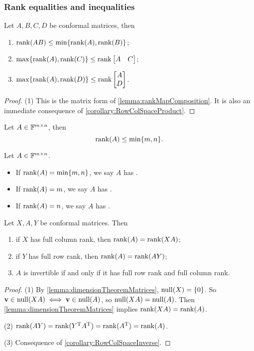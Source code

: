 \subsubsection{Rank equalities and inequalities}
\begin{proposition} \label{prop:rankMultiplication}
Let $A,B,C,D$ be conformal matrices, then
\begin{enumerate}
\item $\operatorname{rank}(AB) \leq \min\{\operatorname{rank}(A),\operatorname{rank}(B)\}$;
\item $\max\{\operatorname{rank}(A),\operatorname{rank}(C)\} \leq \operatorname{rank} \begin{bmatrix}
A & C
\end{bmatrix}$;
\item $\max\{\operatorname{rank}(A),\operatorname{rank}(D)\} \leq \operatorname{rank} \begin{bmatrix}
A \\ D
\end{bmatrix}$.
\end{enumerate}
\end{proposition}
\begin{proof}
(1) This is the matrix form of \ref{lemma:rankMapComposition}. It is also an immediate consequence of \ref{corollary:RowColSpaceProduct}.
\end{proof}

\begin{lemma}
Let $A\in\mathbb{F}^{m\times n}$, then
\[ \operatorname{rank}(A) \leq \min\{m,n\}. \]
\end{lemma}
\begin{definition}
Let $A\in\mathbb{F}^{m\times n}$.
\begin{itemize}
\item If $\operatorname{rank}(A) = \min\{m,n\}$, we say $A$ has .
\item If $\operatorname{rank}(A) = m$, we say $A$ has .
\item If $\operatorname{rank}(A) = n$, we say $A$ has .
\end{itemize}
\end{definition}

\begin{lemma}
Let $X,A,Y$ be conformal matrices. Then
\begin{enumerate}
\item if $X$ has full column rank, then $\operatorname{rank}(A) = \operatorname{rank}(XA)$;
\item if $Y$ has full row rank, then $\operatorname{rank}(A) = \operatorname{rank}(AY)$;
\item $A$ is invertible \textup{if and only if} it has full row rank and full column rank.
\end{enumerate}
\end{lemma}
\begin{proof}
(1) By \ref{lemma:dimensionTheoremMatrices}, $\operatorname{null}(X) = \{0\}$. So $\bm{\mathrm{v}}\in\operatorname{null}(XA) \iff \bm{\mathrm{v}}\in\operatorname{null}(A)$, so $\operatorname{null}(XA) = \operatorname{null}(A)$. Then \ref{lemma:dimensionTheoremMatrices} implies $\operatorname{rank}(XA) = \operatorname{rank}(A)$.

(2) $\operatorname{rank}(AY) = \operatorname{rank}(Y^{\mathrm{T}} A^{\mathrm{T}}) = \operatorname{rank}(A^{\mathrm{T}}) = \operatorname{rank}(A)$.

(3) Consequence of \ref{corollary:RowColSpaceInverse}.
\end{proof}

